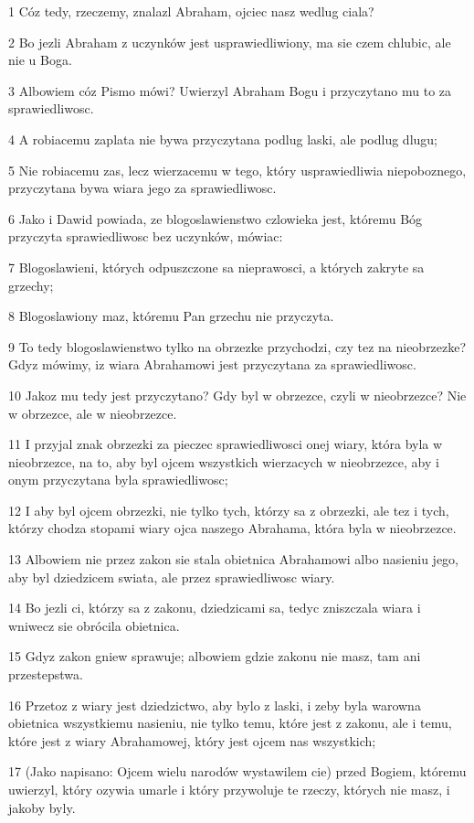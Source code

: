 \par 1 Cóz tedy, rzeczemy, znalazl Abraham, ojciec nasz wedlug ciala?
\par 2 Bo jezli Abraham z uczynków jest usprawiedliwiony, ma sie czem chlubic, ale nie u Boga.
\par 3 Albowiem cóz Pismo mówi? Uwierzyl Abraham Bogu i przyczytano mu to za sprawiedliwosc.
\par 4 A robiacemu zaplata nie bywa przyczytana podlug laski, ale podlug dlugu;
\par 5 Nie robiacemu zas, lecz wierzacemu w tego, który usprawiedliwia niepoboznego, przyczytana bywa wiara jego za sprawiedliwosc.
\par 6 Jako i Dawid powiada, ze blogoslawienstwo czlowieka jest, któremu Bóg przyczyta sprawiedliwosc bez uczynków, mówiac:
\par 7 Blogoslawieni, których odpuszczone sa nieprawosci, a których zakryte sa grzechy;
\par 8 Blogoslawiony maz, któremu Pan grzechu nie przyczyta.
\par 9 To tedy blogoslawienstwo tylko na obrzezke przychodzi, czy tez na nieobrzezke? Gdyz mówimy, iz wiara Abrahamowi jest przyczytana za sprawiedliwosc.
\par 10 Jakoz mu tedy jest przyczytano? Gdy byl w obrzezce, czyli w nieobrzezce? Nie w obrzezce, ale w nieobrzezce.
\par 11 I przyjal znak obrzezki za pieczec sprawiedliwosci onej wiary, która byla w nieobrzezce, na to, aby byl ojcem wszystkich wierzacych w nieobrzezce, aby i onym przyczytana byla sprawiedliwosc;
\par 12 I aby byl ojcem obrzezki, nie tylko tych, którzy sa z obrzezki, ale tez i tych, którzy chodza stopami wiary ojca naszego Abrahama, która byla w nieobrzezce.
\par 13 Albowiem nie przez zakon sie stala obietnica Abrahamowi albo nasieniu jego, aby byl dziedzicem swiata, ale przez sprawiedliwosc wiary.
\par 14 Bo jezli ci, którzy sa z zakonu, dziedzicami sa, tedyc zniszczala wiara i wniwecz sie obrócila obietnica.
\par 15 Gdyz zakon gniew sprawuje; albowiem gdzie zakonu nie masz, tam ani przestepstwa.
\par 16 Przetoz z wiary jest dziedzictwo, aby bylo z laski, i zeby byla warowna obietnica wszystkiemu nasieniu, nie tylko temu, które jest z zakonu, ale i temu, które jest z wiary Abrahamowej, który jest ojcem nas wszystkich;
\par 17 (Jako napisano: Ojcem wielu narodów wystawilem cie) przed Bogiem, któremu uwierzyl, który ozywia umarle i który przywoluje te rzeczy, których nie masz, i jakoby byly.

